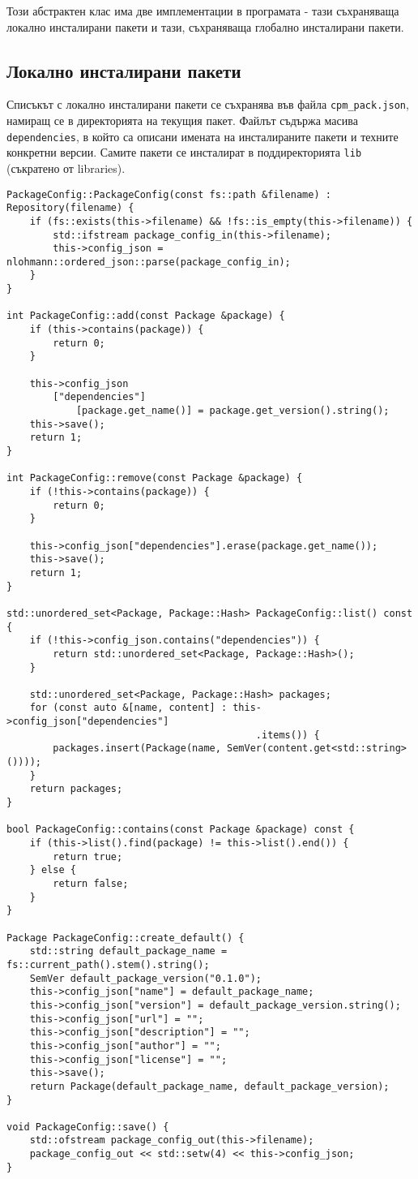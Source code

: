 Този абстрактен клас има две имплементации в програмата - тази съхраняваща
локално инсталирани пакети и тази, съхраняваща глобално инсталирани пакети.


\subsection{Локално инсталирани пакети}

Списъкът с локално инсталирани пакети се съхранява във файла
\texttt{cpm\_pack.json}, намиращ се в директорията на текущия пакет. Файлът
съдържа масива \texttt{dependencies}, в който са описани имената на
инсталираните пакети и техните конкретни версии. Самите пакети се инсталират в
поддиректорията \texttt{lib} (съкратено от libraries).

\begin{lstlisting}[style=cpp,
				   caption=Хранилище за локално инсталирани пакети,
				   label={lst:package-config}]
PackageConfig::PackageConfig(const fs::path &filename) : Repository(filename) {
	if (fs::exists(this->filename) && !fs::is_empty(this->filename)) {
		std::ifstream package_config_in(this->filename);
		this->config_json = nlohmann::ordered_json::parse(package_config_in);
	}
}

int PackageConfig::add(const Package &package) {
	if (this->contains(package)) {
		return 0;
	}

	this->config_json
		["dependencies"]
			[package.get_name()] = package.get_version().string();
	this->save();
	return 1;
}

int PackageConfig::remove(const Package &package) {
	if (!this->contains(package)) {
		return 0;
	}

	this->config_json["dependencies"].erase(package.get_name());
	this->save();
	return 1;
}

std::unordered_set<Package, Package::Hash> PackageConfig::list() const {
	if (!this->config_json.contains("dependencies")) {
		return std::unordered_set<Package, Package::Hash>();
	}

	std::unordered_set<Package, Package::Hash> packages;
	for (const auto &[name, content] : this->config_json["dependencies"]
									       .items()) {
		packages.insert(Package(name, SemVer(content.get<std::string>())));
	}
	return packages;
}

bool PackageConfig::contains(const Package &package) const {
	if (this->list().find(package) != this->list().end()) {
		return true;
	} else {
		return false;
	}
}

Package PackageConfig::create_default() {
	std::string default_package_name = fs::current_path().stem().string();
	SemVer default_package_version("0.1.0");
	this->config_json["name"] = default_package_name;
	this->config_json["version"] = default_package_version.string();
	this->config_json["url"] = "";
	this->config_json["description"] = "";
	this->config_json["author"] = "";
	this->config_json["license"] = "";
	this->save();
	return Package(default_package_name, default_package_version);
}

void PackageConfig::save() {
	std::ofstream package_config_out(this->filename);
	package_config_out << std::setw(4) << this->config_json;
}
\end{lstlisting}


